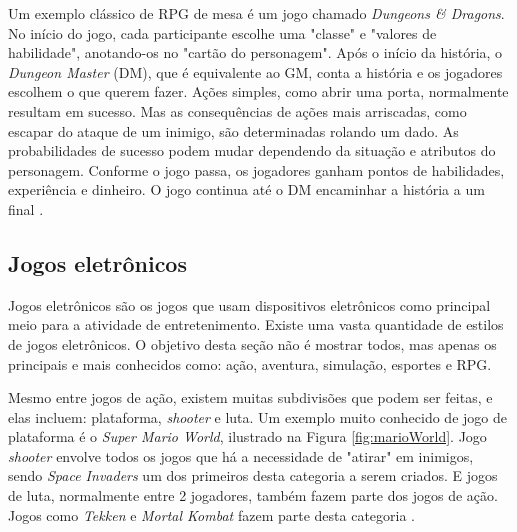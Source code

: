 \documentclass[
	12pt,					%
	openright,				%
	oneside,				%
	a4paper,				%
	bibjustif,				%
	chapter=TITLE,			%
	english,				%
	brazil,					%
	]{abntex2}
\begin{document}
		Um exemplo clássico de RPG de mesa é um jogo chamado \textit{Dungeons \& Dragons}.
		No início do jogo,
		cada participante escolhe uma "classe"{} e "valores de habilidade",
		anotando-os no "cartão do personagem"{}.
		Após o início da história,
		o \textit{Dungeon Master} (DM), que é equivalente ao GM, conta a história
		e os jogadores escolhem o que querem fazer.
		Ações simples, como abrir uma porta, normalmente resultam em sucesso.
		Mas as consequências de ações mais arriscadas,
		como escapar do ataque de um inimigo,
		são determinadas rolando um dado.
		As probabilidades de sucesso podem mudar dependendo da situação e atributos do personagem.
		Conforme o jogo passa,
		os jogadores ganham pontos de habilidades, experiência e dinheiro.
		O jogo continua até o DM encaminhar a história a um final \cite{dungeonsDragons}.
			
	
		\FloatBarrier
		\subsection{Jogos eletrônicos}
		Jogos eletrônicos são os jogos que usam dispositivos eletrônicos como principal meio para a atividade de entretenimento.
		Existe uma vasta quantidade de estilos de jogos eletrônicos.
		O objetivo desta seção não é mostrar todos,
		mas apenas os principais e mais conhecidos como:
		ação, aventura, simulação, esportes e RPG.
		
		Mesmo entre jogos de ação,
		existem muitas subdivisões que podem ser feitas,
		e elas incluem: plataforma, \textit{shooter} e luta.
		Um exemplo muito conhecido de jogo de plataforma é o \textit{Super Mario World},
		ilustrado na Figura \ref{fig:marioWorld}.
		Jogo \textit{shooter} envolve todos os jogos que há a necessidade de "atirar"{} em inimigos,
		sendo \textit{Space Invaders} um dos primeiros desta categoria a serem criados.
		E jogos de luta, normalmente entre 2 jogadores,
		também fazem parte dos jogos de ação.
		Jogos como \textit{Tekken} e \textit{Mortal Kombat} fazem parte desta categoria \cite{gameGenres}.
		
\end{document}
